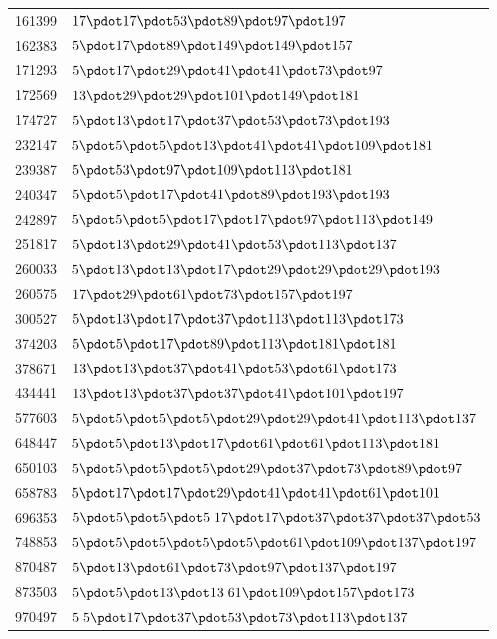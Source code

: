 \begin{longtable}{@{}r|l@{}}
161399 & $17\pdot 17\pdot 53\pdot 89\pdot 97\pdot 197$\\
162383 & $5\pdot 17\pdot 89\pdot 149\pdot 149\pdot 157$\\
171293 & $5\pdot 17\pdot 29\pdot 41\pdot 41\pdot 73\pdot 97$\\
172569 & $13\pdot 29\pdot 29\pdot 101\pdot 149\pdot 181$\\
174727 & $5\pdot 13\pdot 17\pdot 37\pdot 53\pdot 73\pdot 193$\\
232147 & $5\pdot 5\pdot 5\pdot 13\pdot 41\pdot 41\pdot 109\pdot 181$\\
239387 & $5\pdot 53\pdot 97\pdot 109\pdot 113\pdot 181$\\
240347 & $5\pdot 5\pdot 17\pdot 41\pdot 89\pdot 193\pdot 193$\\
242897 & $5\pdot 5\pdot 5\pdot 17\pdot 17\pdot 97\pdot 113\pdot 149$\\
251817 & $5\pdot 13\pdot 29\pdot 41\pdot 53\pdot 113\pdot 137$\\
260033 & $5\pdot 13\pdot 13\pdot 17\pdot 29\pdot 29\pdot 29\pdot 193$\\
260575 & $17\pdot 29\pdot 61\pdot 73\pdot 157\pdot 197$\\
300527 & $5\pdot 13\pdot 17\pdot 37\pdot 113\pdot 113\pdot 173$\\
374203 & $5\pdot 5\pdot 17\pdot 89\pdot 113\pdot 181\pdot 181$\\
378671 & $13\pdot 13\pdot 37\pdot 41\pdot 53\pdot 61\pdot 173$\\
434441 & $13\pdot 13\pdot 37\pdot 37\pdot 41\pdot 101\pdot 197$\\
577603 & $5\pdot 5\pdot 5\pdot 5\pdot 29\pdot 29\pdot 41\pdot 113\pdot 137$\\
648447 & $5\pdot 5\pdot 13\pdot 17\pdot 61\pdot 61\pdot 113\pdot 181$\\
650103 & $5\pdot 5\pdot 5\pdot 5\pdot 29\pdot 37\pdot 73\pdot 89\pdot 97$\\
658783 & $5\pdot 17\pdot 17\pdot 29\pdot 41\pdot 41\pdot 61\pdot 101$\\
696353 & $5\pdot 5\pdot 5\pdot 5\;17\pdot 17\pdot 37\pdot 37\pdot 37\pdot 53$\\
748853 & $5\pdot 5\pdot 5\pdot 5\pdot 5\pdot 61\pdot 109\pdot 137\pdot 197$\\
870487 & $5\pdot 13\pdot 61\pdot 73\pdot 97\pdot 137\pdot 197$\\
873503 & $5\pdot 5\pdot 13\pdot 13\;61\pdot 109\pdot 157\pdot 173$\\
970497 & $5\;5\pdot 17\pdot 37\pdot 53\pdot 73\pdot 113\pdot 137$\\

\end{longtable}
